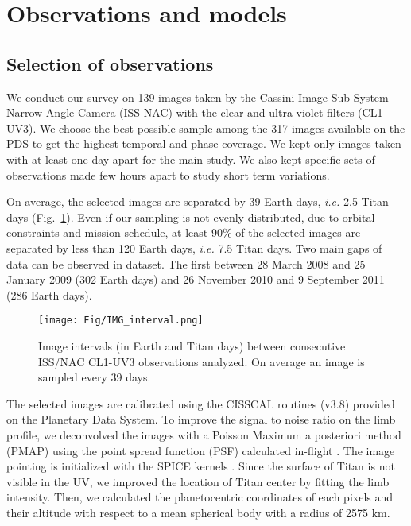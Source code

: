 \section{Observations and models}

\subsection{Selection of observations}
We conduct our survey on 139 images taken by the Cassini Image Sub-System Narrow Angle Camera (ISS-NAC) with the
clear and ultra-violet filters (CL1-UV3). We choose the best possible sample among the 317 images available on the PDS
to get the highest temporal and phase coverage. We kept only images taken with at least one day apart for the main study.
We also kept specific sets of observations made few hours apart to study short term variations.

On average, the selected images are separated by 39 Earth days, \textit{i.e.} 2.5 Titan days (Fig.~\ref{fig:img_sampling}).
Even if our sampling is not evenly distributed, due to orbital constraints and mission schedule, at least 90\% of the selected
images are separated by less than 120 Earth days, \textit{i.e.} 7.5 Titan days. Two main gaps of data can be observed in dataset.
The first between 28 March 2008 and 25 January 2009 (302 Earth days) and 26 November 2010 and 9 September 2011 (286 Earth days).

\begin{figure}[!ht]
\centering
\texttt{[image: Fig/IMG\_interval.png]}
\caption{Image intervals (in Earth and Titan days) between consecutive ISS/NAC CL1-UV3 observations analyzed. On average
an image is sampled every 39 days.}
\label{fig:img_sampling}
\end{figure}

The selected images are calibrated using the CISSCAL routines (v3.8) provided on the Planetary Data System. To improve
the signal to noise ratio on the limb profile, we deconvolved the images with a Poisson Maximum a posteriori method
(PMAP) using the point spread function (PSF) calculated in-flight \citep{West2010}. The image pointing is
initialized with the SPICE kernels \citep{Acton1996, Annex2017}. Since the surface of Titan is not visible in the UV, we improved
the location of Titan center by fitting the limb intensity. Then, we calculated the planetocentric coordinates of each
pixels and their altitude with respect to a mean spherical body with a radius of 2575 km.

